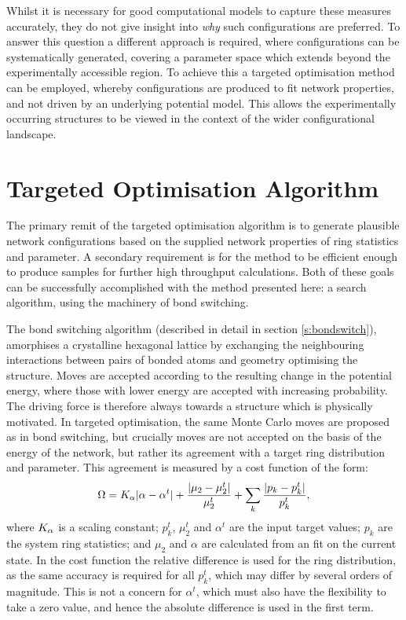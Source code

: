 Whilst it is necessary for good computational models to capture these measures accurately, they do not give insight into \textit{why} such configurations are preferred. 
To answer this question a different approach is required, where configurations can be systematically generated, covering a parameter space which extends beyond the experimentally accessible region.
To achieve this a targeted optimisation method can be employed, whereby configurations are produced to fit network properties, and not driven by an underlying potential model.
This allows the experimentally occurring structures to be viewed in the context of the wider configurational landscape.

\section{Targeted Optimisation Algorithm}
\label{s:targetedoptalg}

The primary remit of the targeted optimisation algorithm is to generate plausible network configurations based on the supplied network properties of ring statistics and \aw{} parameter.
A secondary requirement is for the method to be efficient enough to produce samples for further high throughput calculations.
Both of these goals can be successfully accomplished with the method presented here: a \mc{} search algorithm, using the machinery of bond switching.

The bond switching algorithm (described in detail in section \ref{s:bondswitch}), amorphises a crystalline hexagonal lattice by exchanging the neighbouring interactions between pairs of bonded atoms and geometry optimising the structure.
Moves are accepted according to the resulting change in the potential energy, where those with lower energy are accepted with increasing probability.
The driving force is therefore always towards a structure which is physically motivated.
In targeted optimisation, the same Monte Carlo moves are proposed as in bond switching, but crucially moves are not accepted on the basis of the energy of the network, but rather its agreement with a target ring distribution and \aw{} parameter.
This agreement is measured by a cost function of the form:
\begin{equation}
	\label{eq:costfunc}
	\Omega=K_\alpha\lvert\alpha-\alpha^t\rvert+\frac{\lvert\mu_2-\mu_2^t\rvert}{\mu_2^t}+\sum\limits_k\frac{\lvert p_k-p_k^t\rvert}{p_k^t},
\end{equation} 
where $K_\alpha$ is a scaling constant; $p_k^t$, $\mu_2^t$ and $\alpha^t$ are the input target values; $p_k$ are the system ring statistics; and $\mu_2$ and $\alpha$ are calculated from an \aw{} fit on the current state.
In the cost function the relative difference is used for the ring distribution, as the same accuracy is required for all $p_k^t$, which may differ by several orders of magnitude. 
This is not a concern for $\alpha^t$, which must also have the flexibility to take a zero value, and hence the absolute difference is used in the first term. 

